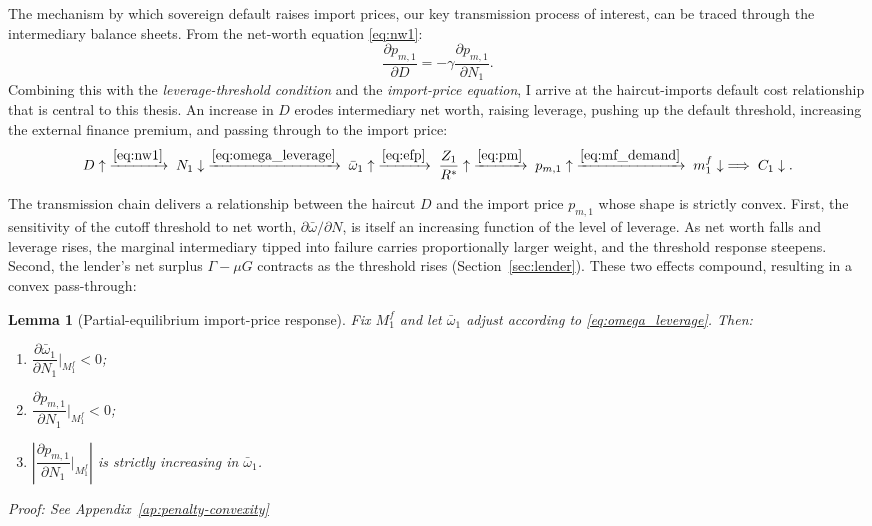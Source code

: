 \documentclass[11pt]{article}
\theoremstyle{definition}
\theoremstyle{plain}
\newtheorem{lemma}{Lemma}
\theoremstyle{remark}
\newcommand{\mf}{m^{f}}
\newcommand{\Rstar}{R^{*}}
\begin{document}
The mechanism by which sovereign default raises import prices, our key transmission process of interest, can be traced through the intermediary balance sheets. From the net-worth equation \eqref{eq:nw1}:
\begin{equation}\label{eq:dpm_dD}
\frac{\partial p_{m,1}}{\partial D} = -\gamma \frac{\partial p_{m,1}}{\partial N_1}.
\end{equation}
Combining this with the \textit{leverage-threshold condition} and the \textit{import-price equation}, I arrive at the haircut-imports default cost relationship that is central to this thesis. An increase in $D$ erodes intermediary net worth, raising leverage, pushing up the default threshold, increasing the external finance premium, and passing through to the import price:
\[
D \uparrow \;\xrightarrow{\eqref{eq:nw1}}\; N_1 \downarrow \;\xrightarrow{\eqref{eq:omega_leverage}}\; \bar{\omega}_1 \uparrow \;\xrightarrow{\eqref{eq:efp}}\; \frac{Z_1}{\Rstar} \uparrow \;\xrightarrow{\eqref{eq:pm}}\; p_{m,1} \uparrow \;\xrightarrow{\eqref{eq:mf_demand}}\; \mf_1 \downarrow \;\Longrightarrow\; C_1 \downarrow.
\]

The transmission chain delivers a relationship between the haircut $D$ and the import price $p_{m,1}$ whose shape is strictly convex. First, the sensitivity of the cutoff threshold to net worth, $\partial\bar\omega/\partial N$, is itself an increasing function of the level of leverage. As net worth falls and leverage rises, the marginal intermediary tipped into failure carries proportionally larger weight, and the threshold response steepens. Second, the lender's net surplus $\Gamma - \mu G$ contracts as the threshold rises (Section~\ref{sec:lender}). These two effects compound, resulting in a convex pass-through:

\begin{lemma}[Partial-equilibrium import-price response]\label{lem:pe-resp}
Fix $M^f_1$ and let $\bar{\omega}_1$ adjust according to \eqref{eq:omega_leverage}. Then:
\begin{enumerate}
    \item[\textup{(i)}] $\dfrac{\partial \bar{\omega}_1}{\partial N_1}\Big|_{M^f_1} < 0$;
    \item[\textup{(ii)}] $\dfrac{\partial p_{m,1}}{\partial N_1}\Big|_{M^f_1} < 0$;
    \item[\textup{(iii)}] $\left|\dfrac{\partial p_{m,1}}{\partial N_1}\Big|_{M^f_1}\right|$ 
    is strictly increasing in $\bar{\omega}_1$.
\end{enumerate}

Proof: See Appendix~\ref{ap:penalty-convexity}

\end{lemma}
\end{document}
